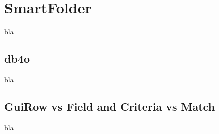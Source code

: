 % 
% 

\section{SmartFolder}

bla

\subsection{db4o}

bla

\subsection{GuiRow vs Field and Criteria vs Match}

bla
